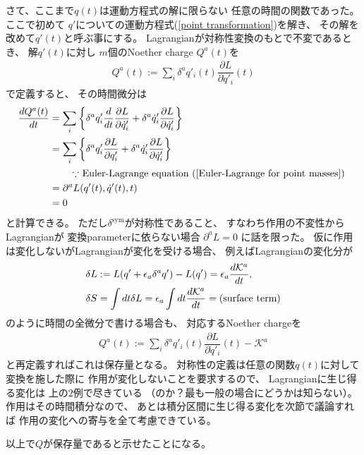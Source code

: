 さて、ここまで$q(t)$は運動方程式の解に限らない
任意の時間の関数であった。
ここで初めて
$q'$についての運動方程式(\ref{point transformation})を解き、
その解を改めて$q'(t)$と呼ぶ事にする。
Lagrangianが対称性変換のもとで不変であるとき、
解$q'(t)$に対し
$m$個のNoether charge $Q^a(t)$を
\begin{align}
  Q^a(t):=
  \sum_i
    \delta^a q'_i (t)
  \dfrac{\partial L}{\partial \dot{q}'_i} (t)
\end{align}
で定義すると、
その時間微分は
\begin{align}
  \dfrac{d Q^a(t)}{dt}
&=
  \sum_i
  \bigg\{
    \delta^a q'_i
  \dfrac{d}{dt}\dfrac{\partial L}{\partial \dot{q}'_i }
+
    \delta^a \dot{q}'_i
    \dfrac{\partial L}{\partial \dot{q}'_i}
  \bigg\}
\notag\\&=
  \sum_i
  \bigg\{
      \delta^a q'_i
    \dfrac{\partial L}{\partial q'_i}
  +
      \delta^a \dot{q}'_i
    \dfrac{\partial L}{\partial \dot{q}'_i}
  \bigg\}
\notag\\&\qquad
    \text{
      $\because$ Euler-Lagrange equation
      (\ref{Euler-Lagrange for point masses})
    }
\notag\\&=
  \partial^a L(q'(t),\dot{q}'(t),t)
  \notag\\&= 0
\end{align}
と計算できる。
ただし$\delta^{\mathrm{sym}}$が対称性であること、
すなわち作用の不変性からLagrangianが
変換parameterに依らない場合
$\partial^a L = 0$
に話を限った。
仮に作用は変化しないがLagrangianが変化を受ける場合、
例えばLagrangianの変化分が
\begin{align}
  \delta L &:= L( q' + \epsilon_a \delta^a q' ) - L( q' )
  = \epsilon_a \dfrac{d \mathcal{K}^a}{dt}
  ,\notag\\
  \delta S &= \int dt \delta L
  = \epsilon_a \int dt \dfrac{d \mathcal{K}^a}{dt}
  = \text{(surface term)}
\end{align}
のように時間の全微分で書ける場合も、
対応するNoether chargeを
\begin{align}
  Q^a(t):=
  \sum_i
    \delta^a q'_i (t)
  \dfrac{\partial L}{\partial \dot{q}'_i} (t)
  -
  \mathcal{K}^a
\end{align}
と再定義すればこれは保存量となる。
対称性の定義は任意の関数$q(t)$に対して
変換を施した際に
作用が変化しないことを要求するので、
Lagrangianに生じ得る変化は
上の$2$例で尽きている
（のか？最も一般の場合にどうかは知らない）。
作用はその時間積分なので、
あとは積分区間に生じ得る変化を次節で議論すれば
作用の変化への寄与を全て考慮できている。

以上で$Q$が保存量であると示せたことになる。

